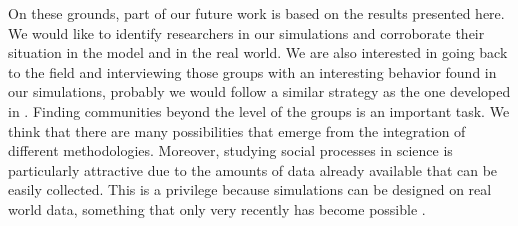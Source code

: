 \documentclass[11pt]{article}
\begin{document}

On these grounds, part of our future work is based on
  the results presented here. We would like to identify researchers
  in our simulations and corroborate their situation in the model and
  in the real world. We are also interested in going back to the field
  and interviewing those groups with an interesting behavior found in
  our simulations, probably we would follow a similar strategy as the
  one developed in \cite{Haraetal2003}. Finding communities beyond the
  level of the groups is an important task. We think that there are
  many possibilities that emerge from the integration of different
  methodologies. Moreover, studying social processes in science is
  particularly attractive due to the amounts of data already available
  that can be easily collected. This is a privilege because
  simulations can be designed on real world data, something that only
  very recently has become possible \cite{Barabasi2011}.\\
\end{document}
